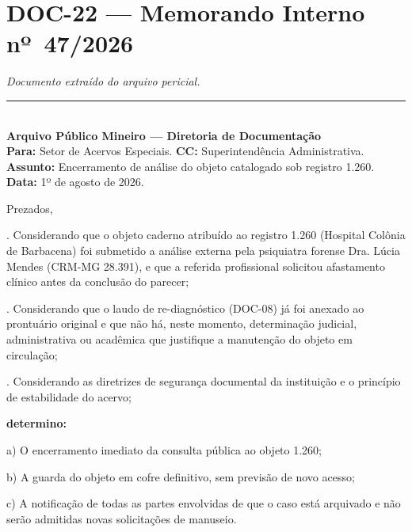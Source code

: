 \section*{\textbf{DOC-22} --- Memorando Interno nº~47/2026}

\noindent \textit{Documento extraído do arquivo pericial.}

\vspace{0.5em}\noindent\rule{\textwidth}{0.5pt}\vspace{0.5em}

\\[-0.2em]

\noindent \textbf{Arquivo Público Mineiro --- Diretoria de Documentação}\\
\noindent \textbf{Para:} Setor de Acervos Especiais. \textbf{CC:} Superintendência Administrativa.\\
\noindent \textbf{Assunto:} Encerramento de análise do objeto catalogado sob registro 1.260.\\
\noindent\textbf{Data:} 1º de agosto de 2026.

\noindent Prezados,

. Considerando que o objeto caderno atribuído ao registro 1.260 (Hospital Colônia de Barbacena) foi submetido a análise externa pela psiquiatra forense Dra. Lúcia Mendes (CRM-MG 28.391), e que a referida profissional solicitou afastamento clínico antes da conclusão do parecer;

. Considerando que o laudo de re-diagnóstico (DOC-08) já foi anexado ao prontuário original e que não há, neste momento, determinação judicial, administrativa ou acadêmica que justifique a manutenção do objeto em circulação;

. Considerando as diretrizes de segurança documental da instituição e o princípio de estabilidade do acervo;

\noindent \textbf{determino:}

\noindent a) O encerramento imediato da consulta pública ao objeto 1.260;

\noindent b) A guarda do objeto em cofre definitivo, sem previsão de novo acesso;

\noindent c) A notificação de todas as partes envolvidas de que o caso está arquivado e não serão admitidas novas solicitações de manuseio.

